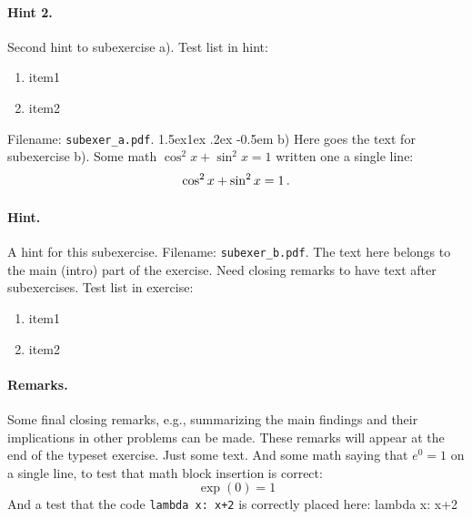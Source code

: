 \documentclass[%
oneside,                 %
final,                   %
10pt]{article}
\makeatletter
\newenvironment{doconceexercise}{}{}
\newcommand\subex{\@startsection{paragraph}{4}{\z@}%
                  {1.5ex\@plus1ex \@minus.2ex}%
                  {-0.5em}%
                  {\normalfont\normalsize\bfseries}}
\theoremstyle{definition}
\makeatother
\begin{document}
\begin{enumerate}
\begin{doconceexercise}
\eccq

\paragraph{Hint 2.}
Second hint to subexercise a).
Test list in hint:
\begin{enumerate}
\item item1
\item item2
\end{enumerate}
\noindent
\noindent Filename: \Verb!subexer_a.pdf!.
\subex{b)}
Here goes the text for subexercise b).
Some math $\cos^2 x + \sin^2 x = 1$ written one a single line:
\[ \cos^2 x + \sin^2 x = 1 \thinspace .\]
\paragraph{Hint.}
A hint for this subexercise.
\noindent Filename: \Verb!subexer_b.pdf!.
The text here belongs to the main (intro) part of the exercise. Need
closing remarks to have text after subexercises.
Test list in exercise:
\begin{enumerate}
\item item1
\item item2
\end{enumerate}
\noindent
\paragraph{Remarks.}
Some final closing remarks, e.g., summarizing the main findings
and their implications in other problems can be made. These
remarks will appear at the end of the typeset exercise.
\end{doconceexercise}
\begin{doconceexercise}
Just some text. And some math saying that $e^0=1$ on a single line,
to test that math block insertion is correct:
\[ \exp{(0)} = 1 \]
And a test that the code \texttt{lambda x: x+2} is correctly placed here:
\bccq
lambda x: x+2


\end{doconceexercise}
\end{enumerate}
\end{document}
